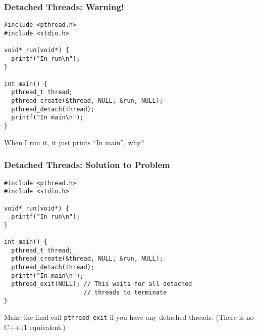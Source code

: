 \documentclass[aspectratio=43]{beamer}
\newenvironment{changemargin}[1]{%
  \begin{list}{}{%
    \setlength{\topsep}{0pt}%
    \setlength{\leftmargin}{#1}%
    \setlength{\rightmargin}{1em}
    \setlength{\listparindent}{\parindent}%
    \setlength{\itemindent}{\parindent}%
    \setlength{\parsep}{\parskip}%
  }%
  \item[]}{\end{list}}
\begin{document}
\begin{frame}[fragile]
  \frametitle{Detached Threads: Warning!}

\begin{changemargin}{1.5cm}
\begin{lstlisting}
#include <pthread.h>
#include <stdio.h>

void* run(void*) {
  printf("In run\n");
}

int main() {
  pthread_t thread;
  pthread_create(&thread, NULL, &run, NULL);
  pthread_detach(thread);
  printf("In main\n");
}
\end{lstlisting}

  When I run it, it just prints ``In main'', why?
\end{changemargin}

\end{frame}

\begin{frame}[fragile]
  \frametitle{Detached Threads: Solution to Problem}

\begin{changemargin}{1.5cm}
  \begin{lstlisting}
#include <pthread.h>
#include <stdio.h>

void* run(void*) {
  printf("In run\n");
}

int main() {
  pthread_t thread;
  pthread_create(&thread, NULL, &run, NULL);
  pthread_detach(thread);
  printf("In main\n");
  pthread_exit(NULL); // This waits for all detached
                      // threads to terminate
}
  \end{lstlisting}

  Make the final call {\tt pthread\_exit} if you have any detached threads. (There is no C++11 equivalent.)
\end{changemargin}
\end{frame}
\end{document}
